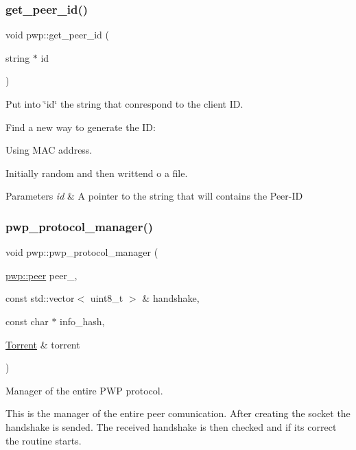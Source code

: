 \subsubsection{\texorpdfstring{get\+\_\+peer\+\_\+id()}{get\_peer\_id()}}
{\footnotesize\ttfamily void pwp\+::get\+\_\+peer\+\_\+id (\begin{DoxyParamCaption}\item[{string $\ast$}]{id }\end{DoxyParamCaption})}



Put into \char`\"{}id\char`\"{} the string that conrespond to the client ID. 

Find a new way to generate the ID\+:
\begin{DoxyEnumerate}
\item Using M\+AC address.
\item Initially random and then writtend o a file.
\end{DoxyEnumerate}


\begin{DoxyParams}{Parameters}
{\em id} & A pointer to the string that will contains the Peer-\/\+ID \\
\hline
\end{DoxyParams}
\mbox{\label{namespacepwp_a62060bdcdc80541b0892e26fbeab1e91}} 
\subsubsection{\texorpdfstring{pwp\+\_\+protocol\+\_\+manager()}{pwp\_protocol\_manager()}}
{\footnotesize\ttfamily void pwp\+::pwp\+\_\+protocol\+\_\+manager (\begin{DoxyParamCaption}\item[{\hyperlink{structpwp_1_1peer}{pwp\+::peer}}]{peer\+\_\+,  }\item[{const std\+::vector$<$ uint8\+\_\+t $>$ \&}]{handshake,  }\item[{const char $\ast$}]{info\+\_\+hash,  }\item[{\hyperlink{structTorrent}{Torrent} \&}]{torrent }\end{DoxyParamCaption})}



Manager of the entire P\+WP protocol. 

This is the manager of the entire peer comunication. After creating the socket the handshake is sended. The received handshake is then checked and if it\textquotesingle{}s correct the routine starts.


